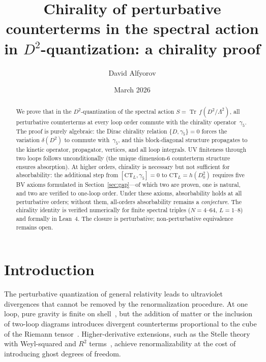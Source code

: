 \documentclass[12pt,a4paper]{article}
\theoremstyle{definition}
\theoremstyle{remark}
\newcommand{\Tr}{\operatorname{Tr}}
\newcommand{\Lam}{\Lambda}
\begin{document}
\title{Chirality of perturbative counterterms in the spectral action\\
in $D^2$-quantization: a chirality proof}

\author{David Alfyorov}

\date{March 2026}

\maketitle

\begin{abstract}

We prove that in the $D^2$-quantization of the spectral action
$S = \Tr\,f(D^2/\Lam^2)$, all perturbative counterterms at every loop
order commute with the chirality operator~$\gamma_5$.  The proof is
purely algebraic: the Dirac chirality relation $\{D, \gamma_5\} = 0$
forces the variation $\delta(D^2)$ to commute with~$\gamma_5$, and this
block-diagonal structure propagates to the kinetic operator, propagator,
vertices, and all loop integrals.  UV finiteness through two loops
follows unconditionally (the unique dimension-6 counterterm structure
ensures absorption).  At higher orders, chirality is necessary but not
sufficient for absorbability: the additional step from
$[\mathrm{CT}_L, \gamma_5] = 0$ to $\mathrm{CT}_L = h(D_0^2)$ requires
five BV axioms formulated in Section~\ref{sec:gap}---of which two are
proven, one is natural, and two are verified to one-loop order.  Under
these axioms, absorbability holds at all perturbative orders; without
them, all-orders absorbability remains a \emph{conjecture}.  The
chirality identity is verified numerically for finite spectral triples
($N = 4$--$64$, $L = 1$--$8$) and formally in Lean~4.  The closure is
perturbative; non-perturbative equivalence remains open.

\end{abstract}

\tableofcontents
\newpage

\section{Introduction}
\label{sec:intro}

The perturbative quantization of general relativity leads to ultraviolet
divergences that cannot be removed by the renormalization procedure.
At one loop, pure gravity is finite on shell~\cite{tHooftVeltman:1974}, but the
addition of matter or the inclusion of two-loop diagrams introduces divergent
counterterms proportional to the cube of the Riemann
tensor~\cite{Goroff:1985th, vandeVen:1992gw}.  Higher-derivative extensions,
such as the Stelle theory with Weyl-squared and $R^2$
terms~\cite{Stelle:1976gc}, achieve renormalizability at the cost of
introducing ghost degrees of freedom.
\end{document}
